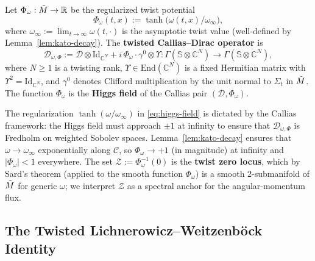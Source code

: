 \begin{definition}\label{def:twisted-callias-dirac}
Let $\Phi_\omega : \tilde{M} \to \mathbb{R}$ be the regularized twist potential
\begin{equation}\label{eq:higgs-field}
\Phi_\omega(t,x) := \tanh\!\bigl(\omega(t,x)/\omega_\infty\bigr),
\end{equation}
where $\omega_\infty := \lim_{t\to\infty}\omega(t,\cdot)$ is the asymptotic twist value (well-defined by Lemma~\ref{lem:kato-decay}). The \textbf{twisted Callias--Dirac operator} is
\begin{equation}\label{eq:callias-dirac}
\mathcal{D}_{\omega,\Phi} := \mathcal{D} \otimes \mathrm{Id}_{\mathbb{C}^N} + i\,\Phi_\omega \cdot \gamma^0 \otimes \Upsilon : \Gamma(\mathbb{S}\otimes\mathbb{C}^N) \to \Gamma(\mathbb{S}\otimes\mathbb{C}^N),
\end{equation}
where $N\geq 1$ is a twisting rank, $\Upsilon\in\mathrm{End}(\mathbb{C}^N)$ is a fixed Hermitian matrix with $\Upsilon^2=\mathrm{Id}_{\mathbb{C}^N}$, and $\gamma^0$ denotes Clifford multiplication by the unit normal to $\Sigma_t$ in $\tilde{M}$. The function $\Phi_\omega$ is the \textbf{Higgs field} of the Callias pair $(\mathcal{D},\Phi_\omega)$.
\end{definition}

\begin{remark}
The regularization $\tanh(\omega/\omega_\infty)$ in \eqref{eq:higgs-field} is dictated by the Callias framework: the Higgs field must approach $\pm 1$ at infinity to ensure that $\mathcal{D}_{\omega,\Phi}$ is Fredholm on weighted Sobolev spaces. Lemma~\ref{lem:kato-decay} ensures that $\omega \to \omega_\infty$ exponentially along $\mathcal{C}$, so $\Phi_\omega \to +1$ (in magnitude) at infinity and $|\Phi_\omega|<1$ everywhere. The set $\mathcal{Z} := \Phi_\omega^{-1}(0)$ is the \textbf{twist zero locus}, which by Sard's theorem (applied to the smooth function $\Phi_\omega$) is a smooth 2-submanifold of $\tilde{M}$ for generic $\omega$; we interpret $\mathcal{Z}$ as a spectral anchor for the angular-momentum flux.
\end{remark}

\subsection{The Twisted Lichnerowicz--Weitzenb\"ock Identity}

